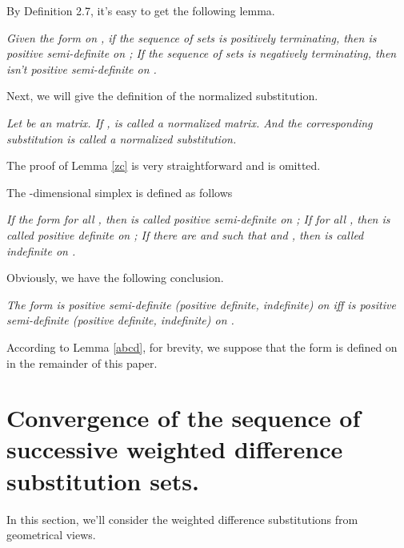 \documentclass [10pt,a4paper]{article}
\begin{document}
  By Definition 2.7, it's easy to get the following lemma.

    \begin{lemma}
\emph{Given the form  on   , if the sequence of
sets  is positively
terminating, then   is positive semi-def\mbox{}inite on
   ; If the
sequence of sets  is
negatively terminating, then   isn't positive
semi-def\mbox{}inite on
   . }
\end{lemma}


Next, we will give the def\mbox{}inition of the normalized
substitution.

\begin{definition}
   \emph{Let  be an  matrix. If ,  is called a normalized matrix.  And the corresponding substitution
   }
\emph{is called a normalized substitution.}
    \end{definition}

 The proof of Lemma  \ref{zc} is very straightforward and is omitted.

The -dimensional simplex  is defined as follows


\begin{definition}
   \emph{ If the form
     for all ,  then  is called positive semi-definite on
   ;
    If
     for all , then
    is called positive definite on
   ; If there are  and 
such that  and  ,  then
    is called indefinite on
   . }
\end{definition}

     Obviously, we have the following conclusion.
 \begin{lemma}  \label{abcd}
\emph{The form  is positive semi-definite (positive definite,
indefinite) on
    iff  is positive semi-definite (positive definite,
indefinite) on
   .}
\end{lemma}

According to Lemma \ref{abcd}, for brevity, we suppose that the form
 is defined  on  in the remainder of this paper.

\section{ Convergence
 of the sequence of successive weighted dif\mbox{}ference substitution sets.}
 In this section, we'll consider the  weighted dif\mbox{}ference
substitutions from geometrical
 views.
\end{document}
